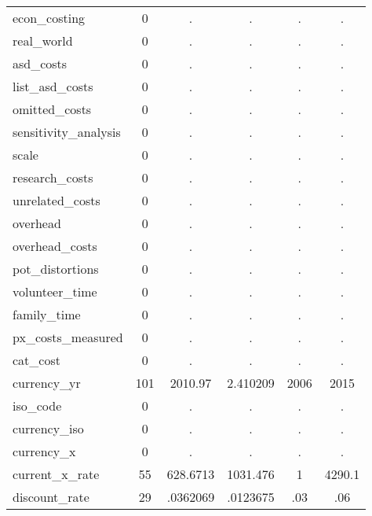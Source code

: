 \begin{table}[htbp]
\begin{tabular}{l*{1}{ccccc}}
econ\_costing&           0&           .&           .&           .&           .\\
real\_world  &           0&           .&           .&           .&           .\\
asd\_costs   &           0&           .&           .&           .&           .\\
list\_asd\_costs&           0&           .&           .&           .&           .\\
omitted\_costs&           0&           .&           .&           .&           .\\
sensitivity\_analysis&           0&           .&           .&           .&           .\\
scale       &           0&           .&           .&           .&           .\\
research\_costs&           0&           .&           .&           .&           .\\
unrelated\_costs&           0&           .&           .&           .&           .\\
overhead    &           0&           .&           .&           .&           .\\
overhead\_costs&           0&           .&           .&           .&           .\\
pot\_distortions&           0&           .&           .&           .&           .\\
volunteer\_time&           0&           .&           .&           .&           .\\
family\_time &           0&           .&           .&           .&           .\\
px\_costs\_measured&           0&           .&           .&           .&           .\\
cat\_cost    &           0&           .&           .&           .&           .\\
currency\_yr &         101&     2010.97&    2.410209&        2006&        2015\\
iso\_code    &           0&           .&           .&           .&           .\\
currency\_iso&           0&           .&           .&           .&           .\\
currency\_x  &           0&           .&           .&           .&           .\\
current\_x\_rate&          55&    628.6713&    1031.476&           1&      4290.1\\
discount\_rate&          29&    .0362069&    .0123675&         .03&         .06\\

\end{tabular}
\end{table}
